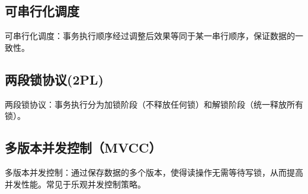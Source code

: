\subsection{可串行化调度}
可串行化调度：事务执行顺序经过调整后效果等同于某一串行顺序，保证数据的一致性。\\

\subsection{两段锁协议(2PL)}
两段锁协议：事务执行分为加锁阶段（不释放任何锁）和解锁阶段（统一释放所有锁）。\\

\subsection{多版本并发控制（MVCC）}
多版本并发控制：通过保存数据的多个版本，使得读操作无需等待写锁，从而提高并发性能。常见于乐观并发控制策略。\\


